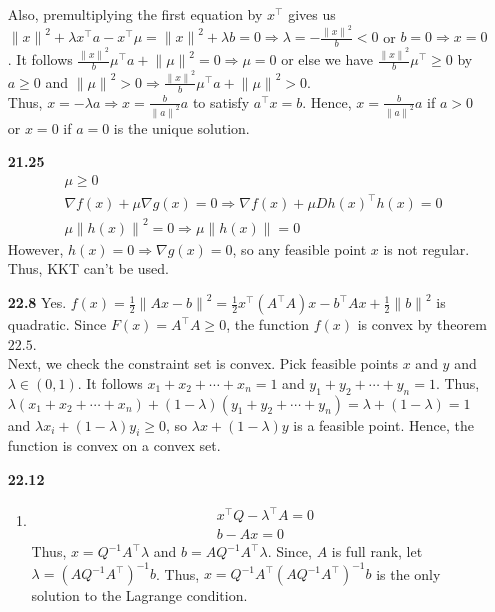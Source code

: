 \documentclass[10pt]{article}
\begin{document}
\begin{enumerate}
    Also, premultiplying the first equation by $x^\top$ gives us ${\lVert x\rVert}^2+\lambda x^\top a-x^\top\mu={\lVert x\rVert}^2+\lambda b=0\Rightarrow \lambda=-\frac{{\lVert x\rVert}^2}{b}<0$ or $b=0\Rightarrow x=0$.  
    It follows $\frac{{\lVert x\rVert}^2}{b}\mu^\top a+{\lVert \mu\rVert}^2=0\Rightarrow \mu=0$ or else we have $\frac{{\lVert x\rVert}^2}{b}\mu^\top\ge 0$ by $a\ge 0$ and ${\lVert \mu\rVert}^2>0\Rightarrow \frac{{\lVert x\rVert}^2}{b}\mu^\top a+{\lVert \mu\rVert}^2>0$.\\
    Thus, $x=-\lambda a\Rightarrow x=\frac{b}{{\lVert a\rVert}^2}a$ to satisfy $a^\top x=b$.
    Hence, $x=\frac{b}{{\lVert a\rVert}^2}a$ if $a>0$ or $x=0$ if $a=0$ is the unique solution.
    \item [\textbf{21.25}]\begin{align*}
        &\mu\ge 0\\
        &\nabla f(x)+\mu\nabla g(x)=0\Rightarrow \nabla f(x)+\mu Dh(x)^\top h(x)=0\\
        &\mu{\lVert h(x)\rVert}^2=0\Rightarrow \mu\lVert h(x)\rVert=0  
    \end{align*}
    However, $h(x)=0\Rightarrow \nabla g(x)=0$, so any feasible point $x$ is not regular. Thus, KKT can't be used.
    \item [\textbf{22.8}] Yes. $f(x)=\frac{1}{2}{\lVert Ax-b\rVert}^2=\frac{1}{2}x^\top (A^\top A)x-b^\top Ax+\frac{1}{2}{\lVert b\rVert}^2$ is quadratic. 
    Since $F(x)=A^\top A\ge 0$, the function $f(x)$ is convex by theorem $22.5$.\\
    Next, we check the constraint set is convex. Pick feasible points $x$ and $y$ and $\lambda\in(0,1)$.
    It follows $x_1+x_2+\cdots+x_n=1$ and $y_1+y_2+\cdots+y_n=1$. 
    Thus, $\lambda(x_1+x_2+\cdots+x_n)+(1-\lambda)(y_1+y_2+\cdots+y_n)=\lambda+(1-\lambda)=1$ and $\lambda x_i+(1-\lambda)y_i\ge 0$, so $\lambda x+(1-\lambda)y$ is a feasible point.
    Hence, the function is convex on a convex set.
    \item [\textbf{22.12}] \begin{enumerate}
        \item \begin{align*}
            &x^\top Q-\lambda^\top A=0\\
            &b-Ax=0
        \end{align*}
        Thus, $x=Q^{-1}A^\top\lambda$ and $b=AQ^{-1}A^\top\lambda$. 
        Since, $A$ is full rank, let $\lambda={(AQ^{-1}A^\top)}^{-1}b$. 
        Thus, $x=Q^{-1}A^\top{(AQ^{-1}A^\top)}^{-1}b$ is the only solution to the Lagrange condition.

\end{enumerate}
\end{enumerate}
\end{document}
